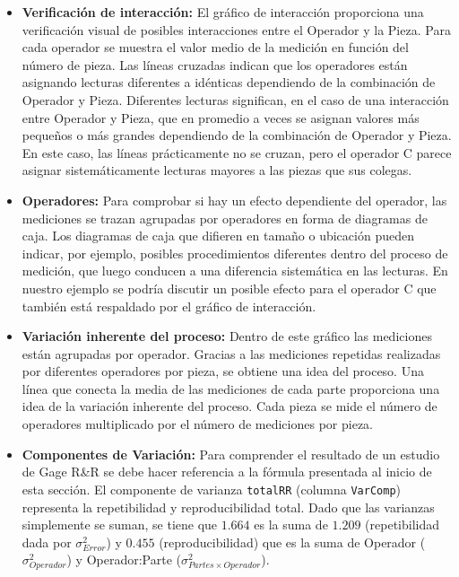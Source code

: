 \documentclass[
]{book}
\begin{document}
\begin{itemize}
\item
  \textbf{Verificación de interacción: } El gráfico de interacción proporciona una verificación visual de posibles interacciones entre el Operador y la Pieza. Para cada operador se muestra el valor medio de la
  medición en función del número de pieza. Las líneas cruzadas indican que los operadores están asignando lecturas diferentes a idénticas dependiendo de la combinación de Operador y Pieza.
  Diferentes lecturas significan, en el caso de una interacción entre Operador y Pieza, que en promedio a veces se asignan valores más pequeños o más grandes dependiendo de la combinación de Operador y Pieza. En este caso, las líneas prácticamente no se cruzan, pero el operador C parece asignar sistemáticamente lecturas mayores a las piezas que sus colegas.
\item
  \textbf{Operadores:} Para comprobar si hay un efecto dependiente del operador, las mediciones se trazan agrupadas por operadores en forma de diagramas de caja. Los diagramas de caja que difieren en tamaño o ubicación pueden indicar, por ejemplo, posibles procedimientos diferentes dentro del proceso de medición, que luego conducen a una diferencia sistemática en las lecturas. En nuestro ejemplo se podría discutir un posible efecto para el operador C que también está respaldado por el gráfico de interacción.
\item
  \textbf{Variación inherente del proceso:} Dentro de este gráfico las mediciones están agrupadas por operador. Gracias a las mediciones repetidas realizadas por diferentes operadores por pieza, se obtiene
  una idea del proceso. Una línea que conecta la media de las mediciones de cada parte proporciona una idea de la variación inherente del proceso. Cada pieza se mide el número de operadores multiplicado por el número de mediciones por pieza.
\item
  \textbf{Componentes de Variación:} Para comprender el resultado de un estudio de Gage R\&R se debe hacer referencia a la fórmula presentada al inicio de esta sección. El componente de varianza \texttt{totalRR} (columna \texttt{VarComp}) representa la repetibilidad y reproducibilidad total. Dado que las varianzas simplemente se suman, se tiene que \(1.664\) es la suma de \(1.209\) (repetibilidad dada por \(\sigma^2_{Error}\)) y \(0.455\) (reproducibilidad) que es la suma de Operador (\(\sigma^2_{Operador}\)) y Operador:Parte (\(\sigma^2_{Partes \times Operador}\)).
\end{itemize}
\end{document}
